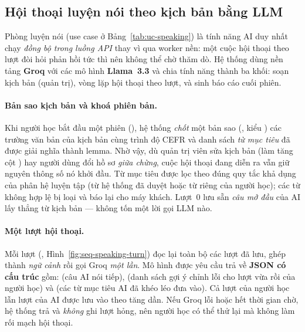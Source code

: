 \subsection{Hội thoại luyện nói theo kịch bản bằng LLM}
\label{subsec:impl-speaking}

Phòng luyện nói (use case ở Bảng~\ref{tab:uc-speaking}) là tính năng AI duy
nhất chạy \textit{đồng bộ trong luồng API} thay vì qua worker nền: một cuộc
hội thoại theo lượt đòi hỏi phản hồi tức thì nên không thể chờ thăm dò. Hệ
thống dùng nền tảng \textbf{Groq} với các mô hình \textbf{Llama~3.3}
\cite{grattafiori2024llama3} và chia tính năng thành ba khối: soạn kịch bản
(quản trị), vòng lặp hội thoại theo lượt, và sinh báo cáo cuối phiên.

\paragraph{Bản sao kịch bản và khoá phiên bản.} Khi người học bắt đầu một
phiên (), hệ thống \textit{chốt} một bản
sao (, kiểu ) các trường văn bản của kịch
bản cùng trình độ CEFR và danh sách \textit{từ mục tiêu} đã được giải
nghĩa thành lemma. Nhờ vậy, dù quản trị viên sửa kịch bản (làm tăng cột
) hay người dùng đổi hồ sơ \textit{giữa chừng}, cuộc hội thoại
đang diễn ra vẫn giữ nguyên thông số nó khởi đầu. Từ mục tiêu được lọc theo
đúng quy tắc khả dụng của phân hệ luyện tập (từ hệ thống đã duyệt hoặc từ
riêng của người học); các từ không hợp lệ bị loại và báo lại cho máy khách.
Lượt~0 lưu sẵn \textit{câu mở đầu} của AI lấy thẳng từ kịch bản --- không tốn
một lời gọi LLM nào.

\paragraph{Một lượt hội thoại.} Mỗi lượt (,
Hình~\ref{fig:seq-speaking-turn}) đọc lại toàn bộ các lượt đã lưu, ghép thành
\textit{ngữ cảnh} rồi gọi Groq \textit{một lần}. Mô hình được yêu cầu trả về
\textbf{JSON có cấu trúc} gồm:  (câu AI nói tiếp), 
(danh sách gợi ý chỉnh lỗi cho lượt vừa rồi của người học) và
 (các từ mục tiêu AI đã khéo léo đưa vào). Cả lượt của
người học lẫn lượt của AI được lưu vào  theo 
tăng dần. Nếu Groq lỗi hoặc hết thời gian chờ, hệ thống trả  và
\textit{không} ghi lượt hỏng, nên người học có thể thử lại mà không làm rối
mạch hội thoại.

